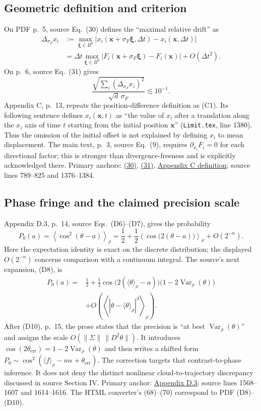\subsection{Geometric definition and criterion}
On PDF p.~5, source Eq.~(30) defines the ``maximal relative drift'' as
\begin{align*}
\Delta_{\sigma_F}x_i
&:=\max_{\boldsymbol\xi\in B^d}
\left|x_i(\mathbf x+\sigma_F\boldsymbol\xi,\Delta t)
             -x_i(\mathbf x,\Delta t)\right|\\
&=\Delta t\max_{\boldsymbol\xi\in B^d}
\left|F_i(\mathbf x+\sigma_F\boldsymbol\xi)-F_i(\mathbf x)\right|
+O(\Delta t^2).
\end{align*}
On p.~6, source Eq.~(31) gives
\[
\frac{\sqrt{\sum_i(\Delta_{\sigma_F}x_i)^2}}{\sqrt d\,\sigma_F}
\lesssim 10^{-1}.
\]
Appendix C, p.~13, repeats the position-difference definition as (C1).
Its following sentence defines $x_i(\mathbf x,t)$ as
``the value of $x_i$ after a translation along the $x_i$ axis of time $t$
starting from the initial position $\mathbf x$''
(\texttt{Limit.tex}, line 1380). Thus the omission of
the initial offset is not explained by defining $x_i$ to mean displacement.
The main text, p.~3, source Eq.~(9), requires
$\partial_{x_i}F_i=0$ for each directional factor; this is stronger than
divergence-freeness and is explicitly acknowledged there.
Primary anchors:
\href{https://arxiv.org/html/2609.28999v2#S4.E30}{(30)},
\href{https://arxiv.org/html/2609.28999v2#S4.E31}{(31)},
\href{https://arxiv.org/html/2609.28999v2#A3.p2}{Appendix C definition};
source lines 789--825 and 1376--1384.

\subsection{Phase fringe and the claimed precision scale}
Appendix D.3, p.~14, source Eqs.~(D6)--(D7), gives the probability
\[
P_0(a)=\left\langle\cos^2(\theta-a)\right\rangle_\rho
=\frac12+\frac12\left\langle\cos\bigl(2(\theta-a)\bigr)
\right\rangle_\rho+O(2^{-n}).
\]
Here the expectation identity is exact on the discrete distribution; the
displayed $O(2^{-n})$ concerns comparison with a continuum integral.
The source's next expansion, (D8), is
\begin{align*}
P_0(a)={}&\frac12+\frac12\cos\bigl(2(\langle\theta\rangle_\rho-a)\bigr)
\bigl(1-2\operatorname{Var}_\rho(\theta)\bigr)\\
&+O\!\left(\left\langle
|\theta-\langle\theta\rangle_\rho|^3\right\rangle_\rho\right).
\end{align*}
After (D10), p.~15, the prose states that the precision is
``at best $\operatorname{Var}_\rho(\theta)$'' and assigns the scale
$O(\|\Sigma\|\,\|D^2\theta\|)$.
It introduces
$\cos(2\theta_{\mathrm{err}})=1-2\operatorname{Var}_\rho(\theta)$
and then writes a shifted form
$P_0\sim\cos^2(\langle f\rangle_\rho-m\epsilon+\theta_{\mathrm{err}})$.
The correction targets that contrast-to-phase inference. It does not deny the
distinct nonlinear cloud-to-trajectory discrepancy discussed in source
Section IV.
Primary anchor:
\href{https://arxiv.org/html/2609.28999v2#A4.SS3}{Appendix D.3};
source lines 1568--1607 and 1614--1616. The HTML converter's (68)--(70)
correspond to PDF (D8)--(D10).

